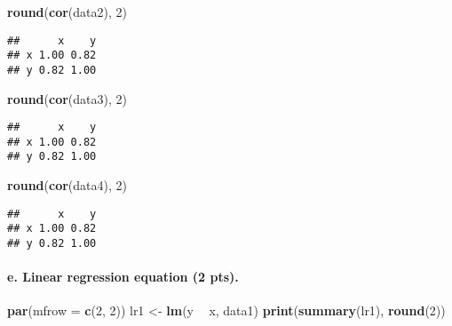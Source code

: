 \documentclass[]{article}
\newenvironment{Shaded}{\begin{snugshade}}{\end{snugshade}}
\newcommand{\KeywordTok}[1]{\textcolor[rgb]{0.13,0.29,0.53}{\textbf{#1}}}
\newcommand{\DataTypeTok}[1]{\textcolor[rgb]{0.13,0.29,0.53}{#1}}
\newcommand{\DecValTok}[1]{\textcolor[rgb]{0.00,0.00,0.81}{#1}}
\newcommand{\StringTok}[1]{\textcolor[rgb]{0.31,0.60,0.02}{#1}}
\newcommand{\OperatorTok}[1]{\textcolor[rgb]{0.81,0.36,0.00}{\textbf{#1}}}
\newcommand{\NormalTok}[1]{#1}
\let\oldparagraph\paragraph
\renewcommand{\paragraph}[1]{\oldparagraph{#1}\mbox{}}
\begin{document}
\begin{Shaded}
\begin{Highlighting}[]
\KeywordTok{round}\NormalTok{(}\KeywordTok{cor}\NormalTok{(data2), }\DecValTok{2}\NormalTok{)}
\end{Highlighting}
\end{Shaded}

\begin{verbatim}
##      x    y
## x 1.00 0.82
## y 0.82 1.00
\end{verbatim}

\begin{Shaded}
\begin{Highlighting}[]
\KeywordTok{round}\NormalTok{(}\KeywordTok{cor}\NormalTok{(data3), }\DecValTok{2}\NormalTok{)}
\end{Highlighting}
\end{Shaded}

\begin{verbatim}
##      x    y
## x 1.00 0.82
## y 0.82 1.00
\end{verbatim}

\begin{Shaded}
\begin{Highlighting}[]
\KeywordTok{round}\NormalTok{(}\KeywordTok{cor}\NormalTok{(data4), }\DecValTok{2}\NormalTok{)}
\end{Highlighting}
\end{Shaded}

\begin{verbatim}
##      x    y
## x 1.00 0.82
## y 0.82 1.00
\end{verbatim}

\paragraph{e. Linear regression equation (2
pts).}\label{e.-linear-regression-equation-2-pts.}

\begin{Shaded}
\begin{Highlighting}[]
\KeywordTok{par}\NormalTok{(}\DataTypeTok{mfrow =} \KeywordTok{c}\NormalTok{(}\DecValTok{2}\NormalTok{, }\DecValTok{2}\NormalTok{))}
\NormalTok{lr1 <-}\StringTok{ }\KeywordTok{lm}\NormalTok{(y }\OperatorTok{~}\StringTok{ }\NormalTok{x, data1)}
\KeywordTok{print}\NormalTok{(}\KeywordTok{summary}\NormalTok{(lr1), }\KeywordTok{round}\NormalTok{(}\DecValTok{2}\NormalTok{))}
\end{Highlighting}
\end{Shaded}
\end{document}
